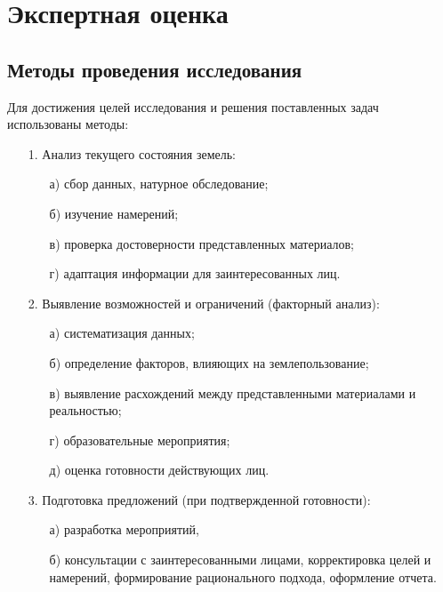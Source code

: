 \section{Экспертная оценка}
\label{sec:expert}

\subsection{Методы проведения исследования}
\label{subsec:method}

Для достижения целей исследования и решения поставленных задач использованы методы:

\begin{enumerate}
    \item[1.] Анализ текущего состояния земель: 
    \begin{enumerate}
        \item[а)] сбор данных, натурное обследование; 
        \item[б)] изучение намерений;
        \item[в)] проверка достоверности представленных материалов;
        \item[г)] адаптация информации для заинтересованных лиц.
    \end{enumerate}
    \item[2.] Выявление возможностей и ограничений (факторный анализ):
    \begin{enumerate}
        \item[а)] систематизация данных;
        \item[б)] определение факторов, влияющих на землепользование; 
        \item[в)] выявление расхождений между представленными материалами и реальностью;
        \item[г)] образовательные мероприятия; 
        \item[д)] оценка готовности действующих лиц.
    \end{enumerate}
    \item[3.] Подготовка предложений (при подтвержденной готовности): 
    \begin{enumerate}
        \item[а)] разработка мероприятий, 
        \item[б)] консультации с заинтересованными лицами, корректировка целей и намерений, формирование рационального подхода, оформление отчета.
    \end{enumerate}
\end{enumerate}


